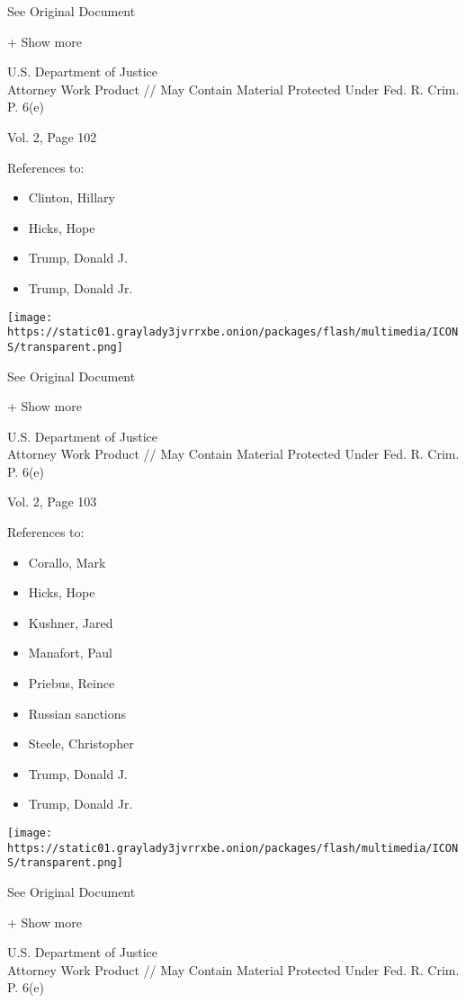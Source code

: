 See Original Document

+ Show more

U.S. Department of Justice\\
Attorney Work Product // May Contain Material Protected Under Fed. R.
Crim. P. 6(e)

Vol. 2, Page 102

References to:

\begin{itemize}
\tightlist
\item
  Clinton, Hillary
\item
  Hicks, Hope
\item
  Trump, Donald J.
\item
  Trump, Donald Jr.
\end{itemize}

\protect\hyperlink{}{}

\texttt{[image: https://static01.graylady3jvrrxbe.onion/packages/flash/multimedia/ICONS/transparent.png]}

See Original Document

+ Show more

U.S. Department of Justice\\
Attorney Work Product // May Contain Material Protected Under Fed. R.
Crim. P. 6(e)

Vol. 2, Page 103

References to:

\begin{itemize}
\tightlist
\item
  Corallo, Mark
\item
  Hicks, Hope
\item
  Kushner, Jared
\item
  Manafort, Paul 
\item
  Priebus, Reince
\item
  Russian sanctions
\item
  Steele, Christopher
\item
  Trump, Donald J.
\item
  Trump, Donald Jr.
\end{itemize}

\protect\hyperlink{}{}

\texttt{[image: https://static01.graylady3jvrrxbe.onion/packages/flash/multimedia/ICONS/transparent.png]}

See Original Document

+ Show more

U.S. Department of Justice\\
Attorney Work Product // May Contain Material Protected Under Fed. R.
Crim. P. 6(e)

